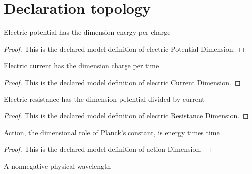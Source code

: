 \section{Declaration topology}
\begin{definition}
  \label{def:physics:phyx-mini-0612:phyxminiproblems-problemphyxmini0612-electricpotentialdimension}
  Electric potential has the dimension energy per charge
\end{definition}
\begin{proof}
  This is the declared model definition of electric Potential Dimension.
\end{proof}
\begin{definition}
  \label{def:physics:phyx-mini-0612:phyxminiproblems-problemphyxmini0612-electriccurrentdimension}
  Electric current has the dimension charge per time
\end{definition}
\begin{proof}
  This is the declared model definition of electric Current Dimension.
\end{proof}
\begin{definition}
  \label{def:physics:phyx-mini-0612:phyxminiproblems-problemphyxmini0612-electricresistancedimension}
  Electric resistance has the dimension potential divided by current
\end{definition}
\begin{proof}
  This is the declared model definition of electric Resistance Dimension.
\end{proof}
\begin{definition}
  \label{def:physics:phyx-mini-0612:phyxminiproblems-problemphyxmini0612-actiondimension}
  Action, the dimensional role of Planck's constant, is energy times time
\end{definition}
\begin{proof}
  This is the declared model definition of action Dimension.
\end{proof}
\begin{definition}
  \label{def:physics:phyx-mini-0612:phyxminiproblems-problemphyxmini0612-wavelengthquantity}
  A nonnegative physical wavelength
\end{definition}
